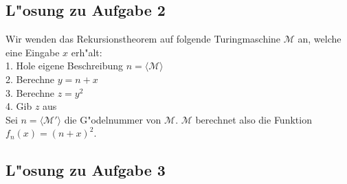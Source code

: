 \documentclass[10pt,oneside,onecolumn,a4paper,german,titlepage]{article}
\begin{document}
\subsection*{L"osung zu Aufgabe 2}
Wir wenden das Rekursionstheorem auf folgende Turingmaschine $\mathcal{M}$ an, welche eine Eingabe $x$ erh"alt:\\[4pt]
1. Hole eigene Beschreibung $n = \langle \mathcal{M} \rangle$\\
2. Berechne $y = n + x$\\
3. Berechne $z = y^2$\\
4. Gib $z$ aus\\[4pt]
Sei $n = \langle\mathcal{M}'\rangle$ die G"odelnummer von $\mathcal{M}$. $\mathcal{M}$ berechnet also die Funktion $f_n(x) = (n+x)^2$.


\subsection*{L"osung zu Aufgabe 3}
\end{document}
